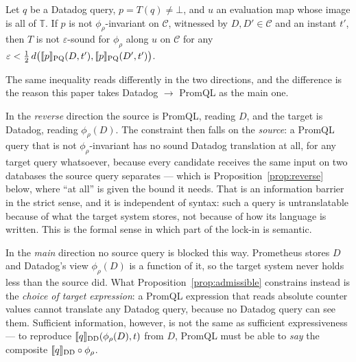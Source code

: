 \begin{proposition}[Admissibility]\label{prop:admissible}
Let $q$ be a Datadog query, $p=T(q)\neq\bot$, and $u$ an evaluation map whose image is
all of $\mathbb{T}$. If $p$ is not $\phi_\rho$-invariant on $\mathcal{C}$, witnessed by
$D,D'\in\mathcal{C}$ and an instant $t'$, then $T$ is not $\varepsilon$-sound for
$\phi_\rho$ along $u$ on $\mathcal{C}$ for any
$\varepsilon<\tfrac12\,d\big(\llbracket p \rrbracket_{\mathrm{PQ}}(D,t'),\llbracket p \rrbracket_{\mathrm{PQ}}(D',t')\big)$.
\end{proposition}
\iffull\fi

\begin{remark}\label{rem:directional}
The same inequality reads differently in the two directions, and the difference is the
reason this paper takes Datadog $\to$ PromQL as the main one.

In the \emph{reverse} direction the source is PromQL, reading $D$, and the target is
Datadog, reading $\phi_\rho(D)$. The constraint then falls on the \emph{source}: a PromQL
query that is not $\phi_\rho$-invariant has no sound Datadog translation at all, for any
target query whatsoever, because every candidate receives the same input on two
databases the source query separates --- which is Proposition~\ref{prop:reverse} below,
where ``at all'' is given the bound it needs. That is an information barrier in the strict
sense, and it is independent of syntax: such a query is untranslatable because of what
the target system stores, not because of how its language is written. This is the formal
sense in which part of the lock-in is semantic.

In the \emph{main} direction no source query is blocked this way. Prometheus stores $D$
and Datadog's view $\phi_\rho(D)$ is a function of it, so the target system never holds
less than the source did. What Proposition~\ref{prop:admissible} constrains instead is
the \emph{choice of target expression}: a PromQL expression that reads absolute counter
values cannot translate any Datadog query, because no Datadog query can see them.
Sufficient information, however, is not the same as sufficient expressiveness --- to
reproduce $\llbracket q \rrbracket_{\mathrm{DD}}(\phi_\rho(D),t)$ from $D$, PromQL must be able to
\emph{say} the composite $\llbracket q \rrbracket_{\mathrm{DD}}\circ\phi_\rho$.


\end{remark}
